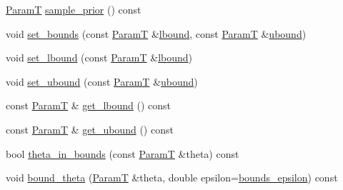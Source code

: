 \begin{DoxyCompactItemize}
\item 
\hyperlink{classmappel_1_1PointEmitterModel_a665ec6aea3aac139bb69a23c06d4b9a1}{ParamT} \hyperlink{classmappel_1_1PointEmitterModel_abd9d2923ca9a838897a9b26bfb3ce073}{sample\+\_\+prior} () const 
\item 
void \hyperlink{classmappel_1_1PointEmitterModel_a31f139d9eb58f210f3359a9f5be9dd15}{set\+\_\+bounds} (const \hyperlink{classmappel_1_1PointEmitterModel_a665ec6aea3aac139bb69a23c06d4b9a1}{ParamT} \&\hyperlink{classmappel_1_1PointEmitterModel_a889bc82f74cfa654da121e5770296ab2}{lbound}, const \hyperlink{classmappel_1_1PointEmitterModel_a665ec6aea3aac139bb69a23c06d4b9a1}{ParamT} \&\hyperlink{classmappel_1_1PointEmitterModel_a35b883e84b6a2e0093bdf482c623beef}{ubound})
\item 
void \hyperlink{classmappel_1_1PointEmitterModel_a737fa5857415b9830fa2e5ccdff48541}{set\+\_\+lbound} (const \hyperlink{classmappel_1_1PointEmitterModel_a665ec6aea3aac139bb69a23c06d4b9a1}{ParamT} \&\hyperlink{classmappel_1_1PointEmitterModel_a889bc82f74cfa654da121e5770296ab2}{lbound})
\item 
void \hyperlink{classmappel_1_1PointEmitterModel_a7363961cc405e585b39e81a7ad85c8d6}{set\+\_\+ubound} (const \hyperlink{classmappel_1_1PointEmitterModel_a665ec6aea3aac139bb69a23c06d4b9a1}{ParamT} \&\hyperlink{classmappel_1_1PointEmitterModel_a35b883e84b6a2e0093bdf482c623beef}{ubound})
\item 
const \hyperlink{classmappel_1_1PointEmitterModel_a665ec6aea3aac139bb69a23c06d4b9a1}{ParamT} \& \hyperlink{classmappel_1_1PointEmitterModel_aeb486e8f6f6fa694e3746e84eebcf848}{get\+\_\+lbound} () const 
\item 
const \hyperlink{classmappel_1_1PointEmitterModel_a665ec6aea3aac139bb69a23c06d4b9a1}{ParamT} \& \hyperlink{classmappel_1_1PointEmitterModel_a0dfb473c48d177a4540d328abb03cd55}{get\+\_\+ubound} () const 
\item 
bool \hyperlink{classmappel_1_1PointEmitterModel_ad50dfc29b6e7167fb4caf8683353079d}{theta\+\_\+in\+\_\+bounds} (const \hyperlink{classmappel_1_1PointEmitterModel_a665ec6aea3aac139bb69a23c06d4b9a1}{ParamT} \&theta) const 
\item 
void \hyperlink{classmappel_1_1PointEmitterModel_a789dfcc9ea1df17a0282fca5705ade85}{bound\+\_\+theta} (\hyperlink{classmappel_1_1PointEmitterModel_a665ec6aea3aac139bb69a23c06d4b9a1}{ParamT} \&theta, double epsilon=\hyperlink{classmappel_1_1PointEmitterModel_ac987a119137b85a27704b1c40e3fab8c}{bounds\+\_\+epsilon}) const 
\item 

\end{DoxyCompactItemize}
